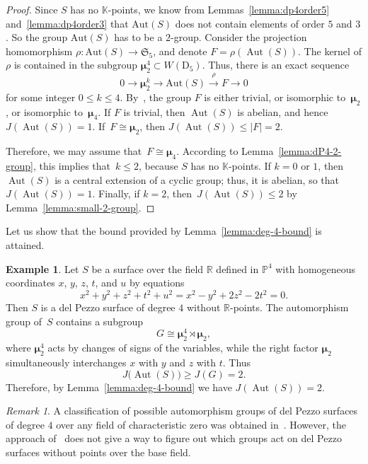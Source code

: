 \documentclass[12pt]{amsart}
\newcounter{cequation}[section]
\theoremstyle{definition}
\newtheorem{example}[cequation]{Example}
\theoremstyle{remark}
\newtheorem{remark}[cequation]{Remark}
\newcommand{\RR}{\mathbb{R}}
\newcommand{\PP}{\mathbb{P}}
\newcommand{\KK}{\mathbb{K}}
\newcommand{\mumu}{{\boldsymbol{\mu}}}
\newcommand{\Aut}{\operatorname{Aut}}
\def \ge {\geqslant}
\def \le {\leqslant}
\begin{document}
\begin{proof}
Since $S$ has no $\KK$-points, we know
from Lemmas~\ref{lemma:dp4order5} and~\ref{lemma:dp4order3} that $\mathrm{Aut}(S)$ does not contain elements of order $5$ and $3$.
So the group $\mathrm{Aut}(S)$ has to be a $2$-group. Consider the projection homomorphism $\rho \colon \mathrm{Aut}(S) \to \mathfrak{S}_5$,
and denote $F=\rho(\Aut(S))$. The kernel of $\rho$ is contained in the subgroup $\mumu_2^4\subset W(\mathrm{D}_5)$.
Thus, there is an exact sequence
$$
0 \to \mumu_2^k \longrightarrow \mathrm{Aut}(S) \stackrel{\rho}{\longrightarrow} F \to 0
$$
for some integer $0 \leqslant k \leqslant 4$.
By~\cite[Theorem~8.6.8]{Dolgachev},
the group $F$ is either trivial, or isomorphic to~$\mumu_2$, or isomorphic to~$\mumu_4$.
If $F$ is trivial, then $\Aut(S)$ is abelian, and hence~\mbox{$J(\Aut(S))=1$}. If~\mbox{$F\cong\mumu_2$}, then $J(\Aut(S)) \leqslant |F|=2$.

Therefore, we may assume that~\mbox{$F\cong\mumu_4$}.
According to Lemma~\ref{lemma:dP4-2-group}, this implies that~\mbox{$k\le 2$}, because $S$ has no $\KK$-points.
If $k=0$ or $1$, then $\Aut(S)$ is a central extension of a cyclic group; thus, it is abelian, so that~\mbox{$J(\Aut(S))=1$}.
Finally, if $k=2$, then~\mbox{$J(\Aut(S))\le 2$} by Lemma~\ref{lemma:small-2-group}.
\end{proof}

Let us show that the bound provided by Lemma~\ref{lemma:deg-4-bound}
is attained.

\begin{example}\label{example:dP4}
Let $S$ be a surface over the field $\RR$
defined in $\PP^4$ with homogeneous coordinates $x$, $y$, $z$, $t$, and $u$ by equations
$$
x^2+y^2+z^2+t^2+u^2=x^2-y^2+2z^2-2t^2=0.
$$
Then $S$ is a del Pezzo surface of degree $4$ without $\RR$-points.
The automorphism group of~$S$ contains a subgroup
$$
G\cong\mumu_2^4\rtimes\mumu_2,
$$
where $\mumu_2^4$ acts by changes of signs of the variables, while the right factor $\mumu_2$
simultaneously interchanges $x$ with $y$ and $z$ with $t$.
Thus
$$
J\big(\Aut(S)\big)\ge J(G)=2.
$$
Therefore, by Lemma~\ref{lemma:deg-4-bound} we have $J(\Aut(S))=2$.
\end{example}




\begin{remark}
A classification of possible automorphism groups of del Pezzo surfaces of
degree $4$ over any field of characteristic zero was obtained in~\cite{Smith}. However,
the approach of~\cite{Smith} does not give a way to figure out which groups act on del Pezzo
surfaces without points over the base field.
\end{remark}
\end{document}
